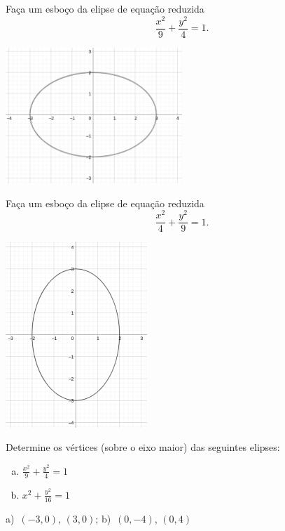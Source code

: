 \begin{exer}
  Faça um esboço da elipse de equação reduzida
  \begin{equation}
    \frac{x^2}{9} + \frac{y^2}{4} = 1.
  \end{equation}
\end{exer}
\begin{resp}
  \includegraphics[width=0.5\textwidth]{cap_conicas/dados/fig_elipse_exer_ox/fig}
\end{resp}

\begin{exer}
  Faça um esboço da elipse de equação reduzida
  \begin{equation}
    \frac{x^2}{4} + \frac{y^2}{9} = 1.
  \end{equation}
\end{exer}
\begin{resp}
  \includegraphics[width=0.4\textwidth]{cap_conicas/dados/fig_elipse_exer_oy/fig}
\end{resp}

\begin{exer}
  Determine os vértices (sobre o eixo maior) das seguintes elipses:
  \begin{enumerate}[a)]
  \item $\displaystyle \frac{x^2}{9} + \frac{y^2}{4} = 1$
  \item $\displaystyle x^2 + \frac{y^2}{16} = 1$
  \end{enumerate}
\end{exer}
\begin{resp}
  a)~$(-3, 0)$, $(3, 0)$; b)~$(0, -4)$, $(0, 4)$
\end{resp}

